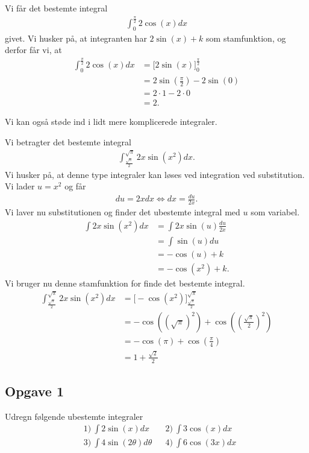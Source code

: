 \begin{exa}
	Vi får det bestemte integral
	\begin{align*}
		\int_0^{\frac{\pi}{2}} 2\cos(x) dx
	\end{align*}
	givet.
	Vi husker på, at integranten har $2\sin(x) + k$ som stamfunktion, og derfor får vi, at
	\begin{align*}
		\int_0^{\frac{\pi}{2}} 2\cos(x) dx &= \big[2\sin(x)\big]_0^{\frac{\pi}{2}} \\
		&= 2\sin\left(\frac{\pi}{2}\right) - 2\sin(0) \\
		&= 2 \cdot 1 - 2 \cdot 0 \\
		&= 2.
	\end{align*}
\end{exa}
Vi kan også støde ind i lidt mere komplicerede integraler.
\begin{exa}
	Vi betragter det bestemte integral
	\begin{align*}
		\int_{\frac{\sqrt{\pi}}{2}}^{\sqrt{\pi}} 2x\sin(x^2) dx.
	\end{align*}
	Vi husker på, at denne type integraler kan løses ved integration ved substitution. Vi lader $u = x^2$ og får
	\begin{align*}
		du = 2x dx \Leftrightarrow dx = \frac{du}{2x}.
	\end{align*}
	Vi laver nu substitutionen og finder det ubestemte integral med $u$ som variabel. 
	\begin{align*}
		\int 2x\sin(x^2) dx &= \int 2x\sin(u) \frac{du}{2x} \\
		&= \int \sin(u) du \\
		&= -\cos(u) + k \\
		&= -\cos(x^2) + k.
	\end{align*}
	Vi bruger nu denne stamfunktion for finde det bestemte integral.
	\begin{align*}
		\int_{\frac{\sqrt{\pi}}{2}}^{\sqrt{\pi}} 2x\sin(x^2) dx &= \Big[-\cos(x^2)\Big]_{\frac{\sqrt{\pi}}{2}}^{\sqrt{\pi}} \\
		&= -\cos\left(\left(\sqrt{\pi}\right)^2\right) + \cos\left(\left(\frac{\sqrt{\pi}}{2}\right)^2\right) \\
		&= -\cos(\pi) + \cos\left(\frac{\pi}{4}\right) \\
		&= 1 + \frac{\sqrt{2}}{2}
	\end{align*}
\end{exa}

\subsection*{Opgave 1}
Udregn følgende ubestemte integraler
\begin{align*}
	&1) \  \int 2\sin(x) dx   &&2) \  \int 3\cos(x) dx  \\
	&3) \  \int 4\sin(2\theta) d\theta   &&4) \   \int 6\cos(3x) dx   
\end{align*}

